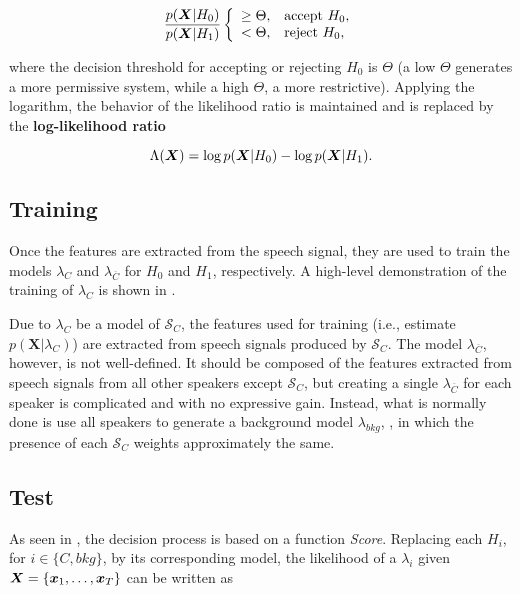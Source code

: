 \begin{equation}
    \frac{\postpdf{\boldsymbol{X}}{H_0}}{\postpdf{\boldsymbol{X}}{H_1}} \verifytestB{\Theta}{H_0}
    \label{eq:likelihood-ratio-test}
\end{equation}

\noindent where the decision threshold for accepting or rejecting $H_0$ is $\Theta$ (a low $\Theta$ generates a more permissive system, while a high $\Theta$, a more restrictive). Applying the logarithm, the behavior of the likelihood ratio is maintained and  is replaced by the \textbf{log-likelihood ratio}

\begin{equation}
    \Lambda(\boldsymbol{X}) = \log \postpdf{\boldsymbol{X}}{H_0} - \log \postpdf{\boldsymbol{X}}{H_1}.
    \label{eq:log-likelihood-ratio-test}
\end{equation}

\subsection{Training}

Once the features are extracted from the speech signal, they are used to train the models $\lambda_{C}$ and $\lambda_{\overline{C}}$ for $H_0$ and $H_1$, respectively. A high-level demonstration of the training of $\lambda_{C}$ is shown in .

Due to $\lambda_{C}$ be a model of $\mathcal{S}_{C}$, the features used for training (i.e., estimate $p(\boldsymbol{X}|\lambda_{C})$) are extracted from speech signals produced by $\mathcal{S}_{C}$. The model $\lambda_{\overline{C}}$, however, is not well-defined. It should be composed of the features extracted from speech signals from all other speakers except $\mathcal{S}_{C}$, but creating a single $\lambda_{\overline{C}}$ for each speaker is complicated and with no expressive gain. Instead, what is normally done is use all speakers to generate a background model $\lambda_{bkg}$, , in which the presence of each $\mathcal{S}_{C}$ weights approximately the same.

\subsection{Test}

As seen in , the decision process is based on a function \emph{Score}. Replacing each $H_i$, for $i \in \{C, bkg\}$, by its corresponding model, the likelihood of a $\lambda_i$ given $\boldsymbol{X} = \{\boldsymbol{x}_1, \dots, \boldsymbol{x}_T\}$ can be written as

